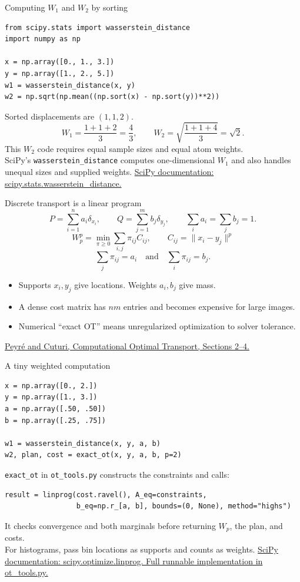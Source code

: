 \documentclass[aspectratio=169,11pt]{beamer}
\newcommand{\src}[2]{\vfill{\tiny\color{gray}\href{#1}{#2}}}
\newcommand{\otref}{\src{https://arxiv.org/abs/1803.00567}{Peyr\'e and Cuturi, Computational Optimal Transport, Sections 2--4.}}
\begin{document}
\begin{frame}[fragile]{Computing $W_1$ and $W_2$ by sorting}
\begin{lstlisting}[basicstyle=\ttfamily\footnotesize]
from scipy.stats import wasserstein_distance
import numpy as np

x = np.array([0., 1., 3.])
y = np.array([1., 2., 5.])
w1 = wasserstein_distance(x, y)
w2 = np.sqrt(np.mean((np.sort(x) - np.sort(y))**2))
\end{lstlisting}
Sorted displacements are $(1,1,2)$.
\[W_1=\frac{1+1+2}{3}=\frac43,\qquad W_2=\sqrt{\frac{1+1+4}{3}}=\sqrt2.\]
\alert{This $W_2$ code requires equal sample sizes and equal atom weights.}\\[2mm]
SciPy's \texttt{wasserstein\_distance} computes one-dimensional $W_1$ and also handles unequal sizes and supplied weights.
\src{https://docs.scipy.org/doc/scipy/reference/generated/scipy.stats.wasserstein_distance.html}{SciPy documentation: scipy.stats.wasserstein\_distance.}
\end{frame}

\begin{frame}{Discrete transport is a linear program}
\[P=\sum_{i=1}^{n}a_i\delta_{x_i},\qquad
Q=\sum_{j=1}^{m}b_j\delta_{y_j},\qquad \sum_i a_i=\sum_j b_j=1.\]
\[\boxed{W_p^p=\min_{\pi\geq0}\sum_{i,j}\pi_{ij}C_{ij}},\qquad
C_{ij}=\|x_i-y_j\|^p\]
\[\sum_j\pi_{ij}=a_i\quad\text{and}\quad\sum_i\pi_{ij}=b_j.\]
\begin{itemize}\setlength\itemsep{3mm}
\item Supports $x_i,y_j$ give locations. Weights $a_i,b_j$ give mass.
\item A dense cost matrix has $nm$ entries and becomes expensive for large images.
\item Numerical ``exact OT'' means unregularized optimization to solver tolerance.
\end{itemize}
\otref
\end{frame}

\begin{frame}[fragile]{A tiny weighted computation}
\begin{lstlisting}
x = np.array([0., 2.])
y = np.array([1., 3.])
a = np.array([.50, .50])
b = np.array([.25, .75])

w1 = wasserstein_distance(x, y, a, b)
w2, plan, cost = exact_ot(x, y, a, b, p=2)
\end{lstlisting}
\texttt{exact\_ot} in \texttt{ot\_tools.py} constructs the constraints and calls:
\begin{lstlisting}[basicstyle=\ttfamily\footnotesize]
result = linprog(cost.ravel(), A_eq=constraints,
                 b_eq=np.r_[a, b], bounds=(0, None), method="highs")
\end{lstlisting}
It checks convergence and both marginals before returning $W_p$, the plan, and costs.\\[2mm]
For histograms, pass bin locations as supports and counts as weights.
\src{https://docs.scipy.org/doc/scipy/reference/generated/scipy.optimize.linprog.html}{SciPy documentation: scipy.optimize.linprog. Full runnable implementation in ot\_tools.py.}
\end{frame}
\end{document}
